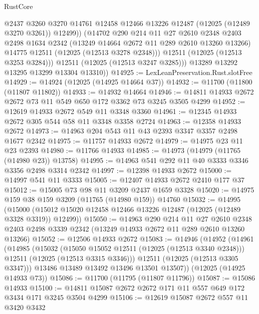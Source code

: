 \begin{lexlean}{RustCore}
\begin{coremodule}
                @2437
                @3260
                @3270
                @14761
                @12458
                @12466
                @13226
                @12487
                (@12025 (@12489 @3270 @3261))
                @12499))
            (@14702
              @290
              @214
              @11
              @27
              @2610
              @2348
              @2403
              @2498
              @1634
              @2342
              (@13249 @14664 @2672 @11 @289 @2610 @13260 @13266)
              @14775
              @12511
              (@12025 (@12513 @3278 @2348)))
            @12511
            (@12025 (@12513 @3253 @3284)))
          @12511
          (@12025 (@12513 @3247 @3285)))
        @13289
        @13292
        @13295
        @13299
        @13304
        @13310))
@14925 := LexLeanPreservation.Rust.slotFree
@14929 := @14924 (@12025 (@14925 @14664 @37))
@14932 := @11700 (@11800 (@11807 @11802))
@14933 := @14932 @14664
@14946 := @14811 @14933 @2672 @2672 @73 @11 @549 @650 @172 @3362 @73 @3245 @3505 @4299
@14952 := @12619 @14933 @2672 @549 @11 @3348 @3360
@14961 := @12345 @14933 @2672 @305 @544 @58 @11 @3348 @3358 @2724
@14963 := @12358 @14933 @2672
@14973 := @14963 @204 @543 @11 @43 @2393 @3347 @3357 @2498 @1677 @2342
@14975 := @11757 @14933 @2672
@14979 := @14975 @23 @11 @23 @2393
@14980 := @11766 @14933
@14985 := @14973 (@14979 (@11765 (@14980 @23)) @13758)
@14995 := @14963 @541 @292 @11 @40 @3333 @3346 @3356 @2498 @3314 @2342
@14997 := @12398 @14933 @2672
@15000 := @14997 @541 @11 @3333
@15005 := @12407 @14933 @2672 @2410 @177 @37
@15012 := @15005 @73 @98 @11 @3209 @2437 @1659 @3328
@15020 := @14975 @159 @38 @159 @3209 (@11765 (@14980 @159)) @14760
@15032 := @14995
    (@15000 (@15012 @15020 @12458 @12466 @13226 @12487 (@12025 (@12489 @3328 @3319)) @12499))
@15050 := @14963
    @290
    @214
    @11
    @27
    @2610
    @2348
    @2403
    @2498
    @3339
    @2342
    (@13249 @14933 @2672 @11 @289 @2610 @13260 @13266)
@15052 := @12506 @14933 @2672
@15083 := @14946
    (@14952
      (@14961
        (@14985
          (@15032
            (@15050 @15052 @12511 (@12025 (@12513 @3340 @2348)))
            @12511
            (@12025 (@12513 @3315 @3346)))
          @12511
          (@12025 (@12513 @3305 @3347)))
        @13486
        @13489
        @13492
        @13496
        @13501
        @13507))
    (@12025 (@14925 @14933 @73))
@15086 := @11700 (@11795 (@11807 @11796))
@15087 := @15086 @14933
@15100 := @14811 @15087 @2672 @2672 @171 @11 @557 @649 @172 @3434 @171 @3245 @3504 @4299
@15106 := @12619 @15087 @2672 @557 @11 @3420 @3432

\end{coremodule}
\end{lexlean}
